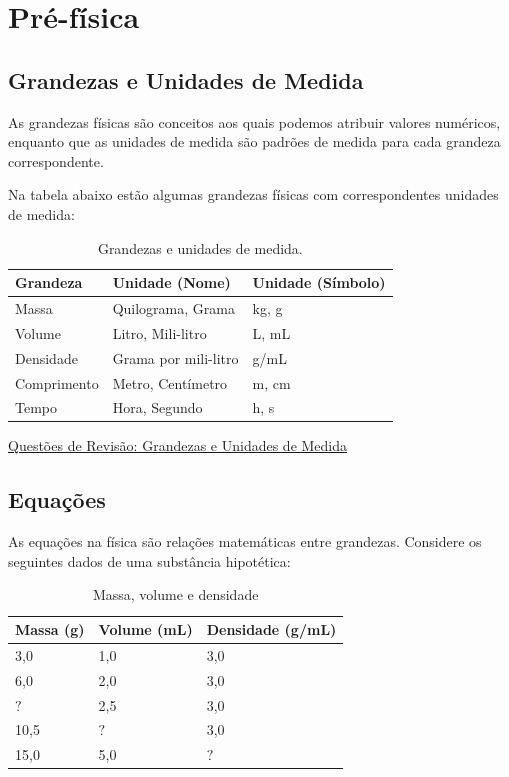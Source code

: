 \documentclass[11pt]{article}
\author{jo}
\date{\today}
\title{}
\begin{document}
\tableofcontents

\section{Pré-física}
\label{sec:org2f323eb}

\subsection{Grandezas e Unidades de Medida}
\label{sec:org8ef5ce4}

As grandezas físicas são conceitos aos quais podemos atribuir valores
numéricos, enquanto que as unidades de medida são padrões de medida
para cada grandeza correspondente.


Na tabela abaixo estão algumas grandezas físicas com correspondentes unidades de medida:

\begin{table}[htbp]
\caption{Grandezas e unidades de medida.}
\centering
\begin{tabular}{lll}
Grandeza & Unidade (Nome) & Unidade (Símbolo)\\
\hline
Massa & Quilograma, Grama & kg, g\\
Volume & Litro, Mili-litro & L, mL\\
Densidade & Grama por mili-litro & g/mL\\
Comprimento & Metro, Centímetro & m, cm\\
Tempo & Hora, Segundo & h, s\\
\end{tabular}
\end{table}

\href{quest-pre-fisica1.org}{Questões de Revisão: Grandezas e Unidades de Medida} 
\subsection{Equações}
\label{sec:orgee1bef8}
As equações na física são relações matemáticas entre
grandezas. Considere os seguintes dados de uma substância hipotética:

\begin{table}[htbp]
\caption{Massa, volume e densidade}
\centering
\begin{tabular}{lll}
Massa (g) & Volume (mL) & Densidade (g/mL)\\
\hline
3,0 & 1,0 & 3,0\\
6,0 & 2,0 & 3,0\\
\(?\) & 2,5 & 3,0\\
10,5 & \(?\) & 3,0\\
15,0 & 5,0 & \(?\)\\
\end{tabular}
\end{table}
\end{document}
